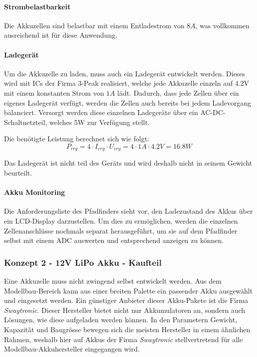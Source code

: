 \documentclass[main.tex]{subfiles} %
\begin{document}
\paragraph{Strombelastbarkeit}
Die Akkuzellen sind belastbar mit einem Entladestrom von $8A$, was vollkommen
ausreichend ist für diese Anwendung.

\paragraph{Ladegerät}
Um die Akkuzelle zu laden, muss auch ein Ladegerät entwickelt werden. Dieses
wird mit ICs der Firma 3-Peak realisiert, welche jede Akkuzelle einzeln auf
4.2V mit einem konstanten Strom von $1A$ lädt. Dadurch, dass jede Zellen über
ein eigenes Ladegerät verfügt, werden die Zellen auch bereits bei jedem
Ladevorgang balanciert. Versorgt werden diese einzelnen Ladegeräte über ein
AC-DC-Schaltnetzteil, welches 5W zur Verfügung stellt.

Die benötigte Leistung berechnet sich wie folgt:
\[
    P_{crg} = 4 \cdot I_{crg} \cdot U_{crg} =  4 \cdot 1A \cdot 4.2V = 16.8W
\]

Das Ladegerät ist nicht teil des Geräts und wird deshalb nicht in seinem
Gewicht beurteilt.

\paragraph{Akku Monitoring}
Die Anforderungsliste des Pfadfinders sieht vor, den Ladezustand des Akkus über
ein LCD-Display darzustellen. Um dies zu ermöglichen, werden die einzelnen
Zellenanschlüsse nochmals separat herausgeführt, um sie auf dem Pfadfinder
selbst mit einem ADC auswerten und entsprechend anzeigen zu können.

\subsubsection*{Konzept 2 - 12V LiPo Akku - Kaufteil}

Eine Akkuzelle muss nicht zwingend selbst entwickelt werden. Aus dem
Modellbau-Bereich kann aus einer breiten Palette ein passender Akku ausgewählt
und eingesetzt werden. Ein günstiger Anbieter dieser Akku-Pakete ist die Firma
\textit{Swaytronic}. Dieser Hersteller bietet nicht nur Akkumulatoren an,
sondern auch Lösungen, wie diese aufgeladen werden können. In den Parametern
Gewicht, Kapazität und Baugrösse bewegen sich die meisten Hersteller in einem
ähnlichen Rahmen, weshalb hier auf Akkus der Firma \textit{Swaytronic}
stellvertretend für alle Modellbau-Akkuhersteller eingegangen wird.
\end{document}
